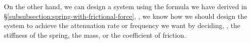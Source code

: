\documentclass{article}
\begin{document}
On the other hand,
we can design a system
using the formula we have derived in \S\ref{subsubsection:spring-with-frictional-force},
\ie,
we know how we should design the system to achieve the attenuation rate or frequency we want
by deciding,
\eg,
the stiffness of the spring,
the mass,
or the coefficient of friction.

%
%
%
%
%
%

%

\end{document}
